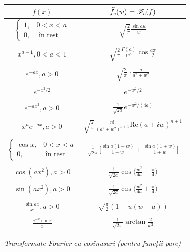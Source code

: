 \begin{figure}[!htbp]
  \centering
  \begin{tabular}{c | c}
    $ f(x) $ & $ \widehat{f}_c(w) = \mathscr{F}_c(f) $ \\
    \hline\hline
    $ \begin{cases} 1, & 0 < x < a \\ 0, &\text{ în rest} \end{cases} $ & $ \sqrt{\frac{2}{\pi}} \frac{\sin aw}{w} $ \\
             & \\
    $ x^{a-1}, 0 < a < 1 $ & $ \sqrt{\frac{2}{\pi}} \frac{\Gamma(a)}{w^a} \cos \frac{a\pi}{2} $ \\
             & \\
    $ e^{-ax}, a > 0 $ & $ \sqrt{\frac{2}{\pi}} \cdot \frac{a}{a^2 + w^2} $ \\
             & \\
    $ e^{-x^2/2} $ & $ e^{-w^2/2} $ \\
             & \\
    $ e^{-ax^2}, a > 0 $ & $ \frac{1}{\sqrt{2a}} e^{-w^2/(4a)} $ \\
             & \\
    $ x^n e^{-ax}, a > 0 $ & $ \sqrt{\frac{2}{\pi}} \frac{n!}{(a^2 + w^2)^{n+1}} \mathrm{Re}(a + iw)^{n+1} $ \\
             & \\
    $ \begin{cases} \cos x, & 0 < x < a \\ 0, & \text{ în rest} \end{cases} $ & $ \frac{1}{\sqrt{2\pi}} \Big[ \frac{\sin a(1 - w)}{1 - w} + \frac{\sin a(1 + w)}{1 + w} \Big] $ \\
             & \\
    $ \cos (ax^2), a > 0 $ & $ \frac{1}{\sqrt{2a}} \cos \Big( \frac{w^2}{4a} - \frac{\pi}{4} \Big) $ \\
             & \\
    $ \sin (ax^2), a > 0 $ & $ \frac{1}{\sqrt{2a}} \cos \Big( \frac{w^2}{4a} + \frac{\pi}{4} \Big) $ \\
             & \\
    $ \frac{\sin ax}{x}, a > 0 $ & $ \sqrt{\frac{\pi}{2}} (1 - u(w - a)) $\footnotemark \\
             & \\
    $ \frac{e^{-x} \sin x}{x} $ & $ \frac{1}{\sqrt{2\pi}} \arctan \frac{2}{w^2} $ \\
  \end{tabular}
  \caption{\emph{Transformate Fourier cu cosinusuri (pentru funcții pare)}}
\end{figure}


